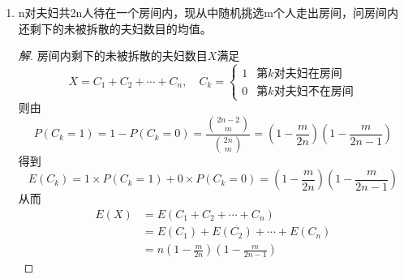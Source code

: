 \documentclass[12pt]{article}
\newcommand{\hei}{\CJKfamily{hei}}                          %
\begin{document}
\begin{enumerate}

\item {\hei n对夫妇共2n人待在一个房间内，现从中随机挑选m个人走出房间，问房间内还剩下的未被拆散的夫妇数目的均值。}
\begin{proof}[解]
	房间内剩下的未被拆散的夫妇数目$X$满足
	\begin{equation}
	X=C_1+C_2+\cdots+C_n,\quad C_k=\left\{
	\begin{array}{cc}
	1 & \mbox{第$k$对夫妇在房间}\\
	0 & \mbox{第$k$对夫妇不在房间}
	\end{array}
	\right.
	\end{equation}
	则由\begin{equation}
	P(C_k=1)=1-P(C_k=0)=\frac{\binom{2n-2}{m}}{\binom{2n}{m}}=\left(1-\frac{m}{2n}\right)\left(1-\frac{m}{2n-1}\right)
	\end{equation}
	得到\begin{equation}
	E(C_k)=1\times P(C_k=1)+0\times P(C_k=0)=\left(1-\frac{m}{2n}\right)\left(1-\frac{m}{2n-1}\right)
	\end{equation}
	从而\begin{equation}
	\begin{aligned}
	E(X)&=E(C_1+C_2+\cdots+C_n)\\
	&=E(C_1)+E(C_2)+\cdots+E(C_n) \\
	&=n\left(1-\frac{m}{2n}\right)\left(1-\frac{m}{2n-1}\right)
	\end{aligned}
	\end{equation}
\end{proof}


\end{enumerate}
\end{document}
